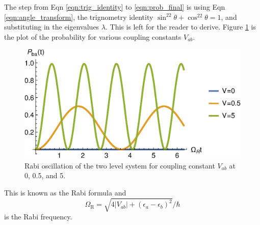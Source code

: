 \documentclass{article}
\begin{document}
The step from Eqn \eqref{eqn:trig_identity} to \eqref{eqn:prob_final}
is using Eqn \eqref{eqn:angle_transform}, the trignometry identity
$\sin^22\theta + \cos^22\theta = 1$, and substituting in the eigenvalues $\lambda$.
This is left for the reader to derive. Figure \ref{fig:prob} is the plot of
the probability for various coupling constants $V_{ab}$.
\begin{figure}[hbpt]
  \centering
  \includegraphics[scale=0.8]{prob2.eps}
  \caption{Rabi oscillation of the two level system for coupling constant $V_{ab}$ at 0, 0.5, and
  5.}
  \label{fig:prob}
\end{figure}
This is known as the Rabi formula and
\begin{equation}
  \Omega_{\text{R}}=\sqrt{4|V_{ab}|+(\epsilon_a-\epsilon_b)^2}/\hbar
\end{equation}
is the Rabi frequency.
\end{document}
